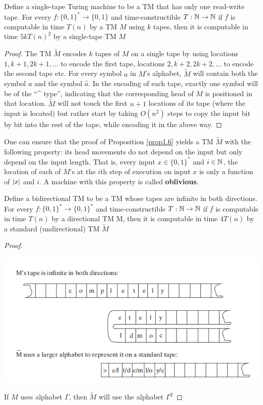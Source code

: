 \documentclass[11pt]{article}
\begin{document}
\begin{proposition}[]
\label{prop1.6}
Define a single-tape Turing machine to be a TM that has only one read-write tape. For every
\(f:\{0,1\}^*\to\{0,1\}\) and time-constructible \(T:\mathbb{N}\to\mathbb{N}\) if \(f\) is computable in
time \(T(n)\) by a TM \(M\) using \(k\) tapes, then it is computable in time \(5kT(n)^2\) by a
single-tape TM \(M\)
\end{proposition}

\begin{proof}
The TM \(\tilde{M}\) encodes \(k\) tapes of \(M\) on a single tape by using
locations \(1,k+1,2k+1,\dots\) to encode the first tape, locations \(2,k+2,2k+2,\dots\) to
encode the second tape etc. For every symbol \(a\) in \(M\)'s alphabet, \(\tilde{M}\) will
contain both the symbol \(a\) and the symbol \(\hat{a}\). In the encoding of each tape, exactly
one symbol will be of the ``\^{} type'', indicating that the corresponding head of \(M\) is
positioned in that location. \(\tilde{M}\) will not touch the first \(n+1\) locations of its
tape (where the input is located) but rather start by taking \(O(n^2)\) steps to copy the input
bit by bit into the rest of the tape, while encoding it in the above way.
\end{proof}

\begin{remark}
One can ensure that the proof of Proposition \ref{prop1.6} yields a TM \(\tilde{M}\) with the
following property: its head movements do not depend on the input but only depend on the input
length. That is, every input \(x\in\{0,1\}^*\) and \(i\in\mathbb{N}\), the location of each of \(M\)'s
at the \(i\)th step of execution on input \(x\) is only a function of \(\abs{x}\) and \(i\). A
machine with this property is called \textbf{oblivious}.
\end{remark}

\begin{proposition}[]
Define a bidirectional TM to be a TM whose tapes are infinite in both directions. For
every \(f:\{0,1\}^*\to\{0,1\}^*\) and time-constructible \(T:\mathbb{N}\to\mathbb{N}\) if \(f\) is computable in
time \(T(n)\) by a directional TM M, then it is computable in time \(4T(n)\) by a standard
(undirectional) TM \(\tilde{M}\)
\end{proposition}

\begin{proof}
\begin{center}
\includegraphics[width=.5\textwidth]{../images/ComputationalComplexity/2.png}
\end{center}

If \(M\) uses alphabet \(\Gamma\), then \(\tilde{M}\) will use the alphabet \(\Gamma^2\) 
\end{proof}
\end{document}
